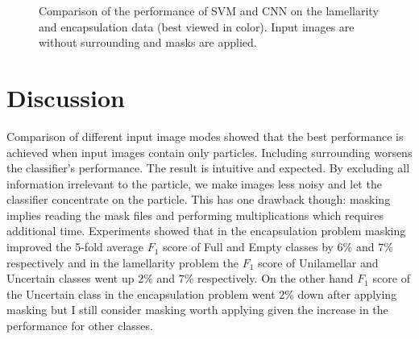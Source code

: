 \documentclass[a4paper, 11pt, table]{article}
\begin{document}
\begin{landscape}
\begin{figure}
\caption{\label{fig:svm_vs_cnn} Comparison of the performance of SVM and CNN  on the lamellarity and encapsulation data (best viewed in color). Input images are without surrounding and masks are applied.}
\end{figure}
 
\end{landscape}

\section{Discussion}

Comparison of different input image modes showed that the best performance is achieved when input images contain only particles. Including surrounding worsens the classifier's performance. The result is intuitive and expected. By excluding all information irrelevant to the particle, we make images less noisy and let the classifier concentrate on the particle. This has one drawback though: masking implies reading the mask files and performing multiplications which requires additional time. Experiments showed that in the encapsulation problem masking improved the 5-fold average $F_1$ score of Full and Empty classes by $6\%$ and $7\%$ respectively and in the lamellarity problem the $F_1$ score of Unilamellar and Uncertain classes went up $2\%$ and $7\%$ respectively. On the other hand $F_1$ score of the Uncertain class in the encapsulation problem went $2\%$ down after applying masking but I still consider masking worth applying given the increase in the performance for other classes.
\end{document}
